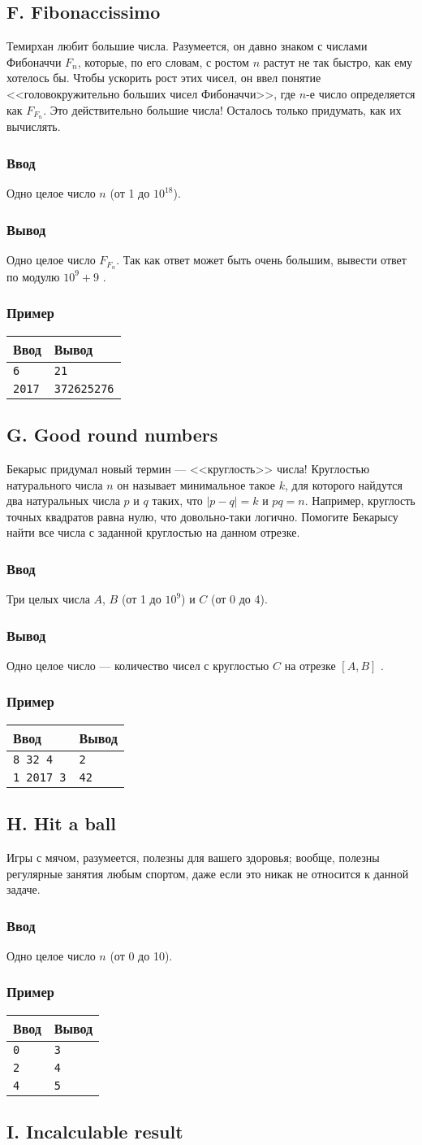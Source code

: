 \documentclass[10pt, a4paper]{article}
\newcommand{\informat}[1]
{
	\subsubsection*{Ввод} #1
}
\newcommand{\outformat}[1]
{
	\subsubsection*{Вывод} #1
}
\newcommand{\examplee}[4]
{
	\subsubsection*{Пример}
	\noindent
	\begin{center}
	\begin{tabularx}{\linewidth}{|X|X|}
	\hline
	Ввод 	& Вывод  	\\
	\hline
	{\tt #1} & {\tt #2}	\\
	\hline
	{\tt #3} & {\tt #4}	\\
	\hline
	\end{tabularx}
	\end{center}
}
\newcommand{\exampleee}[6]
{
	\subsubsection*{Пример}
	\noindent
	\begin{center}
	\begin{tabularx}{\linewidth}{|X|X|}
	\hline
	Ввод 	& Вывод  	\\
	\hline
	{\tt #1} & {\tt #2}	\\
	\hline
	{\tt #3} & {\tt #4}	\\
	\hline
	{\tt #5} & {\tt #6}	\\
	\hline
	\end{tabularx}
	\end{center}
}
\begin{document}
\subsection*{F. Fibonaccissimo}
 
Темирхан любит большие числа. Разумеется, он давно знаком с числами Фибоначчи $F_n$, которые, по его словам, с ростом $n$ растут не так быстро, как ему хотелось бы. Чтобы ускорить рост этих чисел, он ввел понятие <<головокружительно больших чисел Фибоначчи>>, где $n$-е число определяется как $F_{F_n}$. Это действительно большие числа! Осталось только придумать, как их вычислять.

\informat{Одно целое число $n$ (от 1 до $10^{18}$).}

\outformat{Одно целое число $F_{F_n}$. Так как ответ может быть очень большим, вывести ответ по модулю $10^9 + 9$}.

\examplee{6}{21}{2017}{372625276}

\subsection*{G. Good round numbers}
 
Бекарыс придумал новый термин --- <<круглость>> числа! Круглостью натурального числа $n$ он называет минимальное такое $k$, для которого найдутся два натуральных числа $p$ и $q$ таких, что $|p - q| = k$ и $p q = n$. Например, круглость точных квадратов равна нулю, что довольно-таки логично. Помогите Бекарысу найти все числа с заданной круглостью на данном отрезке.
 
\informat{Три целых числа $A$, $B$ (от 1 до $10^9$) и $C$ (от 0 до 4).}

\outformat{Одно целое число --- количество чисел с круглостью $C$ на отрезке $[A, B]$}.
 
\examplee{8 32 4}{2}{1 2017 3}{42}


\subsection*{H. Hit a ball}

Игры с мячом, разумеется, полезны для вашего здоровья; вообще, полезны регулярные занятия любым спортом, даже если это никак не относится к данной задаче.
 
\informat{Одно целое число $n$ (от 0 до 10).}

\exampleee{0}{3}{2}{4}{4}{5}

\subsection*{I. Incalculable result}
\end{document}
